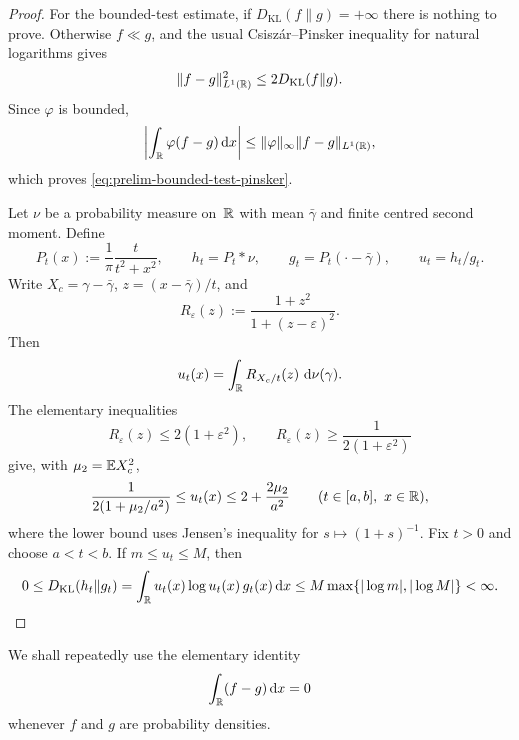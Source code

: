 \begin{proof}
For the bounded-test estimate, if \(D_{\mathrm{KL}}(f\|g)=+\infty\) there is
nothing to prove.  Otherwise \(f\ll g\), and the usual
Csisz{\'a}r--Pinsker inequality for natural logarithms gives
\[
\|f-g\|_{L^1(\mathbb{R})}^2\le 2D_{\mathrm{KL}}(f\|g).
\]
Since \(\varphi\) is bounded,
\[
\left|\int_{\mathbb{R}}\varphi(f-g)\,\mathrm{d} x\right|
\le \|\varphi\|_\infty\|f-g\|_{L^1(\mathbb{R})} ,
\]
which proves \eqref{eq:prelim-bounded-test-pinsker}.

Let \(\nu\) be a probability measure on~\(\mathbb{R}\) with mean \(\bar{\gamma}\) and
finite centred second moment.  Define
\[
P_t(x):=\frac{1}{\pi}\frac{t}{t^2+x^2},\qquad
h_t=P_t*\nu,\qquad g_t=P_t(\cdot-\bar{\gamma}),\qquad u_t=h_t/g_t .
\]
Write \(X_c=\gamma-\bar{\gamma}\), \(z=(x-\bar{\gamma})/t\), and
\[
R_\varepsilon(z):=\frac{1+z^2}{1+(z-\varepsilon)^2}.
\]
Then
\[
u_t(x)=\int_{\mathbb{R}}R_{X_c/t}(z)\,\,\mathrm{d}\nu(\gamma).
\]
The elementary inequalities
\[
R_\varepsilon(z)\le 2(1+\varepsilon^2),
\qquad
R_\varepsilon(z)\ge \frac{1}{2(1+\varepsilon^2)}
\]
give, with \(\mu_2=\mathbb{E} X_c^2\),
\[
\frac{1}{2(1+\mu_2/a^2)}
\le u_t(x)\le 2+\frac{2\mu_2}{a^2}
\qquad (t\in[a,b],\ x\in\mathbb{R}),
\]
where the lower bound uses Jensen's inequality for
\(s\mapsto(1+s)^{-1}\).  Fix \(t>0\) and choose \(a<t<b\).  If
\(m\le u_t\le M\), then
\[
0\le D_{\mathrm{KL}}(h_t\|g_t)
=\int_{\mathbb{R}}u_t(x)\log u_t(x)\,g_t(x)\,\mathrm{d} x
\le M\max\{|\log m|,|\log M|\}<\infty .
\]
\end{proof}
We shall repeatedly use the elementary identity
\[
\int_{\mathbb{R}}(f-g)\,\mathrm{d} x=0
\]
whenever $f$ and $g$ are probability densities.
